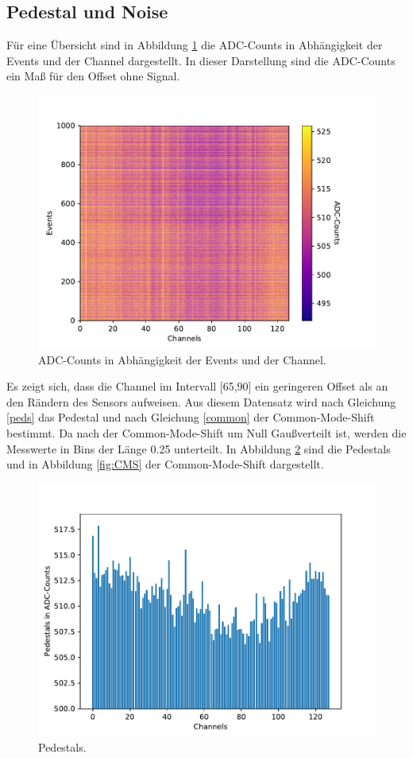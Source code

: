 \subsection{Pedestal und Noise}
Für eine Übersicht sind in Abbildung \ref{fig:ADC} die ADC-Counts in Abhängigkeit der Events und der Channel dargestellt. In dieser Darstellung sind die ADC-Counts ein Maß für den Offset ohne Signal.

\begin{figure}[H]
  \centering
  \includegraphics[width=1\textwidth]{build/ADC.pdf}
  \caption{ADC-Counts in Abhängigkeit der Events und der Channel.}
  \label{fig:ADC}
\end{figure}


Es zeigt sich, dass die Channel im Intervall [65,90] ein geringeren Offset als an den Rändern des Sensors aufweisen. Aus diesem Datensatz wird nach Gleichung \eqref{peds} das Pedestal und nach Gleichung \eqref{common} der Common-Mode-Shift bestimmt. Da nach \cite{skript} der Common-Mode-Shift um Null Gaußverteilt ist, werden die Messwerte in Bins der Länge 0.25 unterteilt. In Abbildung \ref{fig:pedestals} sind die Pedestals und in Abbildung \ref{fig:CMS} der Common-Mode-Shift dargestellt.

\begin{figure}[H]
  \centering
  \includegraphics{build/Pedestals.pdf}
  \caption{Pedestals.}
  \label{fig:pedestals}
\end{figure}


